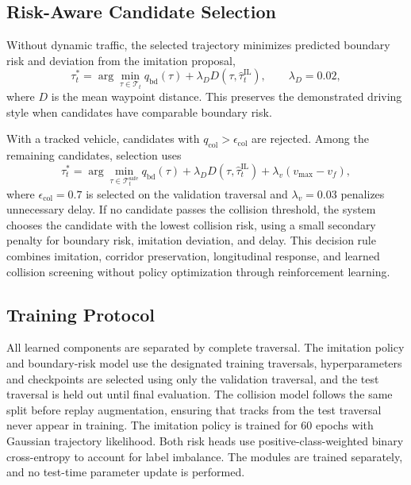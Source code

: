 \subsection{Risk-Aware Candidate Selection}

Without dynamic traffic, the selected trajectory minimizes predicted boundary risk and deviation from the imitation proposal,
\begin{equation}
\tau_t^*=\arg\min_{\tau\in\mathcal{T}_t}
q_{\mathrm{bd}}(\tau)+\lambda_D
D(\tau,\hat{\tau}^{\mathrm{IL}}_t),
\qquad \lambda_D=0.02,
\label{eq:screening_score}
\end{equation}
where $D$ is the mean waypoint distance. This preserves the demonstrated driving style when candidates have comparable boundary risk.

With a tracked vehicle, candidates with $q_{\mathrm{col}}>\epsilon_{\mathrm{col}}$ are rejected. Among the remaining candidates, selection uses
\begin{equation}
\tau_t^*=\arg\min_{\tau\in\mathcal{T}^{\mathrm{safe}}_t}
q_{\mathrm{bd}}(\tau)+\lambda_D D(\tau,\hat{\tau}^{\mathrm{IL}}_t)
+\lambda_v(v_{\max}-v_f),
\label{eq:deployment}
\end{equation}
where $\epsilon_{\mathrm{col}}=0.7$ is selected on the validation traversal and $\lambda_v=0.03$ penalizes unnecessary delay. If no candidate passes the collision threshold, the system chooses the candidate with the lowest collision risk, using a small secondary penalty for boundary risk, imitation deviation, and delay. This decision rule combines imitation, corridor preservation, longitudinal response, and learned collision screening without policy optimization through reinforcement learning.

\subsection{Training Protocol}

All learned components are separated by complete traversal. The imitation policy and boundary-risk model use the designated training traversals, hyperparameters and checkpoints are selected using only the validation traversal, and the test traversal is held out until final evaluation. The collision model follows the same split before replay augmentation, ensuring that tracks from the test traversal never appear in training. The imitation policy is trained for 60 epochs with Gaussian trajectory likelihood. Both risk heads use positive-class-weighted binary cross-entropy to account for label imbalance. The modules are trained separately, and no test-time parameter update is performed.
